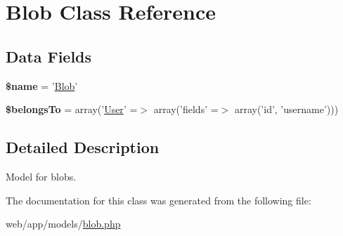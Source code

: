 \hypertarget{class_blob}{
\section{Blob Class Reference}
\label{class_blob}
}
\subsection*{Data Fields}
\begin{DoxyCompactItemize}
\item 
\hypertarget{class_blob_ab2fc40d43824ea3e1ce5d86dee0d763b}{
{\bfseries \$name} = '\hyperlink{class_blob}{Blob}'}
\label{class_blob_ab2fc40d43824ea3e1ce5d86dee0d763b}

\item 
\hypertarget{class_blob_a1578683643768f402aa354aabf0c1c31}{
{\bfseries \$belongsTo} = array('\hyperlink{class_user}{User}' =$>$ array('fields' =$>$ array('id', 'username')))}
\label{class_blob_a1578683643768f402aa354aabf0c1c31}

\end{DoxyCompactItemize}


\subsection{Detailed Description}
Model for blobs. 

The documentation for this class was generated from the following file:\begin{DoxyCompactItemize}
\item 
web/app/models/\hyperlink{blob_8php}{blob.php}\end{DoxyCompactItemize}
